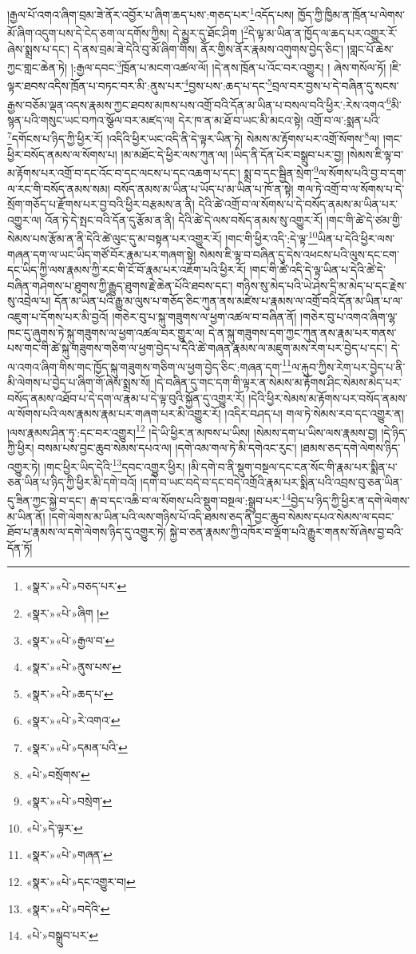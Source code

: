 །རྒྱལ་པོ་འགའ་ཞིག་བྲམ་ཟེ་ནོར་འབྱོར་པ་ཞིག་ཆད་པས་:གཅད་པར་\footnote{«སྣར་»«པེ་»བཅད་པར་}འདོད་པས། ཁྱོད་ཀྱི་ཁྱིམ་ན་ཁྲོན་པ་ལེགས་མོ་ཞིག་འདུག་པས་དེ་ངེད་ཅག་ལ་དགོས་ཀྱིས། དེ་མྱུར་དུ་ཐོང་ཤིག །\footnote{«སྣར་»«པེ་»ཞིག །}དེ་ལྟ་མ་ཡིན་ན་ཁྱོད་ལ་ཆད་པར་འགྱུར་རོ་ཞེས་སྨྲས་པ་དང་། དེ་ནས་བྲམ་ཟེ་དེའི་བུ་མོ་ཞིག་གིས། ནོར་གྱིས་ནོར་རྣམས་འགུགས་བྱེད་ཅིང་། །གླང་པོ་ཆེས་ཀྱང་གླང་ཆེན་ཏེ། །:རྒྱལ་དབང་\footnote{«སྣར་»«པེ་»རྒྱལ་བ་}ཁྲོན་པ་མངག་འཚལ་ལོ། །དེ་ནས་ཁྲོན་པ་འོང་བར་འགྱུར། །
ཞེས་གསོལ་ཏོ། །ཇི་ལྟར་ཐབས་འདིས་ཁྲོན་པ་བཏང་བར་མི་:ནུས་པར་\footnote{«སྣར་»«པེ་»ནུས་པས་}བྱས་པས་:ཆད་པ་དང་\footnote{«སྣར་»«པེ་»ཆད་པ་}བྲལ་བར་བྱས་པ་དེ་བཞིན་དུ་སངས་རྒྱས་བཅོམ་ལྡན་འདས་རྣམས་ཀྱང་ཐབས་མཁས་པས་འགྲོ་བའི་དོན་མ་ཡིན་པ་བསལ་བའི་ཕྱིར་:རེས་འགའ་\footnote{«སྣར་»«པེ་»རེ་འགའ་}མི་སྙན་པའི་གསུང་ཡང་བཀའ་སྩོལ་བར་མཛད་ལ། དེར་ཁ་ན་མ་ཐོ་བ་ཡང་མི་མངའ་སྟེ། འགྲོ་བ་ལ་:སྨན་པའི་\footnote{«སྣར་»«པེ་»དམན་པའི་}དགོངས་པ་ཉིད་ཀྱི་ཕྱིར་རོ། །འདིའི་ཕྱིར་ཡང་འདི་ནི་དེ་ལྟར་ཡིན་ཏེ། སེམས་མ་རྟོགས་པར་འགྲོ་སོགས་\footnote{«པེ་»བསྲོགས་}ལ། །གང་ཕྱིར་བསོད་ནམས་ལ་སོགས་པ། །མ་མཐོང་དེ་ཕྱིར་ལས་ཀུན་ལ། །ཡིད་ནི་དོན་པོར་བསྒྲུབ་པར་བྱ། །སེམས་ཇི་ལྟ་བ་མ་རྟོགས་པར་འགྲོ་བ་དང་འོང་བ་དང་ལངས་པ་དང་འཆག་པ་དང་། སྨྲ་བ་དང་སྦྱིན་སྲེག་\footnote{«སྣར་»«པེ་»བསྲེག་}ལ་སོགས་པའི་བྱ་བ་དག་ལ་རང་གི་བསོད་ནམས་སམ། བསོད་ནམས་མ་ཡིན་པ་ཡོད་པ་མ་ཡིན་པ་ཁོ་ན་སྟེ། གལ་ཏེ་འགྲོ་བ་ལ་སོགས་པ་དེ་སྲོག་གཅོད་པ་རྫོགས་པར་བྱ་བའི་ཕྱིར་བརྩམས་ན་ནི། དེའི་ཚེ་འགྲོ་བ་ལ་སོགས་པ་དེ་བསོད་ནམས་མ་ཡིན་པར་འགྱུར་ལ། འོན་ཏེ་དེ་སྤང་བའི་དོན་དུ་རྩོམ་ན་ནི། དེའི་ཚེ་དེ་ལས་བསོད་ནམས་སུ་འགྱུར་རོ། །གང་གི་ཚེ་དེ་ཙམ་གྱི་སེམས་པས་རྩོམ་ན་ནི་དེའི་ཚེ་ལུང་དུ་མ་བསྟན་པར་འགྱུར་རོ། །གང་གི་ཕྱིར་འདི་:དེ་ལྟ་\footnote{«པེ་»དེ་ལྟར་}ཡིན་པ་དེའི་ཕྱིར་ལས་གཞན་དག་ལ་ཡང་ཡིད་གཙོ་བོར་རྣམ་པར་གཞག་སྟེ། སེམས་ཇི་ལྟ་བ་བཞིན་དུ་དེས་འཕངས་པའི་ལུས་དང་ངག་དང་ཡིད་ཀྱི་ལས་རྣམས་ཀྱི་རང་གི་ངོ་བོ་རྣམ་པར་འཇོག་པའི་ཕྱིར་རོ། །གང་གི་ཚེ་འདི་དེ་ལྟ་ཡིན་པ་དེའི་ཚེ་དེ་བཞིན་གཤེགས་པ་ཐུགས་ཀྱི་རྒྱུད་ཐུགས་རྗེ་ཆེན་པོའི་ཐབས་དང་། གཉིས་སུ་མེད་པའི་ཡེ་ཤེས་དྲི་མ་མེད་པ་དང་རྗེས་སུ་འབྲེལ་པ། དོན་མ་ཡིན་པའི་རྒྱུ་མ་ལུས་པ་གཅོད་ཅིང་ཀུན་ནས་མཛེས་པ་རྣམས་ལ་འགྲོ་བའི་དོན་མ་ཡིན་པ་ལ་འཇུག་པ་དོགས་པར་མི་བྱའོ། །གཅེར་བུ་པ་སྐུ་གཟུགས་ལ་ཕྱག་འཚལ་བ་བཞིན་ནོ། །གཅེར་བུ་པ་འགའ་ཞིག་ལྷ་ཁང་དུ་ཞུགས་ཏེ་སྐུ་གཟུགས་ལ་ཕྱག་འཚལ་བར་གྱུར་ལ། དེ་ན་སྐུ་གཟུགས་དག་ཀྱང་ཀུན་ནས་རྣམ་པར་གནས་པས་གང་གི་ཚེ་སྐུ་གཟུགས་གཅིག་ལ་ཕྱག་བྱེད་པ་དེའི་ཚེ་གཞན་རྣམས་ལ་མཇུག་མས་རེག་པར་བྱེད་པ་དང་། དེ་ལ་འགའ་ཞིག་གིས་གང་ཁྱོད་སྐུ་གཟུགས་གཅིག་ལ་ཕྱག་བྱེད་ཅིང་:གཞན་དག་\footnote{«སྣར་»«པེ་»གཞན་}ལ་རྐུབ་ཀྱིས་རེག་པར་བྱེད་པ་ནི་མི་ལེགས་པ་བྱེད་པ་ཞིག་གོ་ཞེས་སྨྲས་སོ། །དེ་བཞིན་དུ་གང་དག་གི་ལྟར་ན་སེམས་མ་རྟོགས་ཤིང་སེམས་མེད་པར་བསོད་ནམས་འཐོབ་པ་དེ་དག་ལ་རྣམ་པ་དེ་ལྟ་བུའི་སྐྱོན་དུ་འགྱུར་རོ། །དེའི་ཕྱིར་སེམས་མ་རྟོགས་པར་བསོད་ནམས་ལ་སོགས་པའི་ལས་རྣམས་རྣམ་པར་གཞག་པར་མི་འགྱུར་རོ། །འདིར་བཤད་པ། གལ་ཏེ་སེམས་རབ་དང་འགྱུར་ན། །ལས་རྣམས་ཤིན་ཏུ་:དང་བར་འགྱུར།\footnote{«སྣར་»«པེ་»དང་འགྱུར་བ།} །དེ་ཡི་ཕྱིར་ན་མཁས་པ་ཡིས། །སེམས་དག་པ་ཡིས་ལས་རྣམས་བྱ། །དེ་ཉིད་ཀྱི་ཕྱིར། བསམ་པས་བྱང་ཆུབ་སེམས་དཔའ་ལ། །དགེ་འམ་གལ་ཏེ་མི་དགེའང་རུང་། །ཐམས་ཅད་དགེ་ལེགས་ཉིད་འགྱུར་ཏེ། །གང་ཕྱིར་ཡིད་དེའི་\footnote{«སྣར་»«པེ་»བདེའི་}དབང་འགྱུར་ཕྱིར། །མི་དགེ་བ་ནི་སྡུག་བསྔལ་དང་ངན་སོང་གི་རྣམ་པར་སྨིན་པ་ཅན་ཡིན་པ་ཉིད་ཀྱི་ཕྱིར་མི་དགེ་བའོ། །དགེ་བ་ཡང་བདེ་བ་དང་བདེ་འགྲོའི་རྣམ་པར་སྨིན་པའི་འབྲས་བུ་ཅན་ཡིན་དུ་ཟིན་ཀྱང་སྐྱེ་བ་དང་། རྒ་བ་དང་འཆི་བ་ལ་སོགས་པའི་སྡུག་བསྔལ་:སྒྲུབ་པར་\footnote{«པེ་»བསྒྲུབ་པར་}བྱེད་པ་ཉིད་ཀྱི་ཕྱིར་ན་དགེ་ལེགས་མ་ཡིན་ནོ། །དགེ་ལེགས་མ་ཡིན་པའི་ལས་གཉིས་པོ་འདི་ཐམས་ཅད་ནི་བྱང་ཆུབ་སེམས་དཔའ་སེམས་ལ་དབང་ཐོབ་པ་རྣམས་ལ་དགེ་ལེགས་ཉིད་དུ་འགྱུར་ཏེ། སྐྱེ་བ་ཅན་རྣམས་ཀྱི་འཁོར་བ་ལྡོག་པའི་རྒྱུར་གནས་སོ་ཞེས་བྱ་བའི་དོན་ཏོ། 